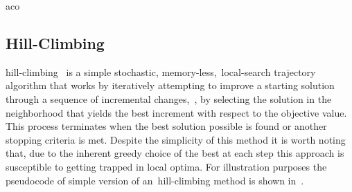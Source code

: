 % 
% 
% 
% 
\begin{algorithm}
  \label{algorithm:aco}
  \caption{\acrlong{aco}}
  
\end{algorithm}

\subsection{Hill-Climbing}
\label{subsec:hill-climbing}

\acrfull{hill-climbing}~\cite{luke2013essentialsa,vieira2009uma} is a simple
stochastic, memory-less,~\acrshort{local-search} trajectory algorithm that works
by iteratively attempting to improve a starting solution through a sequence of
incremental changes,~\ie{}, by selecting the solution in the neighborhood that
yields the best increment with respect to the objective value. This process
terminates when the best solution possible is found or another stopping
criteria is met. Despite the simplicity of this method it is worth noting that,
due to the inherent greedy choice of the best at each step this approach is
susceptible to getting trapped in local optima. For illustration purposes the
pseudocode of simple version of an~\acrshort{hill-climbing} method is shown
in~.

